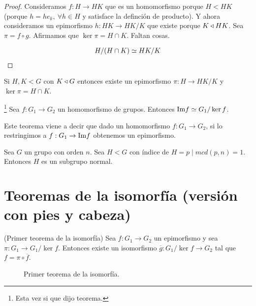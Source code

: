 


\begin{proof}
	Consideramos $f:H \to HK$ que es un homomorfismo porque $H < HK$ (porque $h = he_k,\ \forall h \in H$ y satisface la definción de producto). Y ahora consideramos un epimorfismo $h:HK \to HK/K$ que existe porque $K \mathbin{\triangleleft} HK$. Sea $\pi = f \circ g$. Afirmamos que $\ker \pi = H \cap K$. Faltan cosas.
	
	\begin{align*}
		H/(H\cap K) \simeq HK/K
	\end{align*}
\end{proof}

\begin{cor}
	Si $H,K < G$ con $K \mathbin{\triangleleft} G$ entonces existe un epimorfismo $\pi:H\to HK/K$ y $\ker \pi = H \cap K$.
\end{cor}

\begin{thm}\footnote{Esta vez si que dijo teorema.}
	Sea $f:G_1 \to G_2$ un homomorfismo de grupos. Entonces $\text{Im} f \simeq G_1 / \ker f$.
\end{thm}

Este teorema viene a decir que dado un homomorfismo $f:G_1 \to G_2$, si lo restringimos a $f:G_1 \to \text{Im} f$ obtenemos un epimorfismo.


\begin{pro}
	Sea $G$ un grupo con orden $n$. Sea $H < G$ con índice de $H = p \mid mcd(p,n) = 1$. Entonces $H$ es un subgrupo normal.
\end{pro}

\section{Teoremas de la isomorfía (versión con pies y cabeza)}

\begin{thm}(Primer teorema de la isomorfía)
	Sea $f:G_1 \to G_2$ un epimorfismo y sea $\pi:G_1 \to G_1/\ker f$. Entonces existe un isomorfismo $\overline{g} : G_1 / \ker f \to G_2$ tal que $f = \pi \circ \overline{f}$.
\end{thm}

\begin{figure}[h]
	\centering
	\caption{Primer teorema de la isomorfía.}
	\label{fig:tmisomorfia1}
\end{figure}

